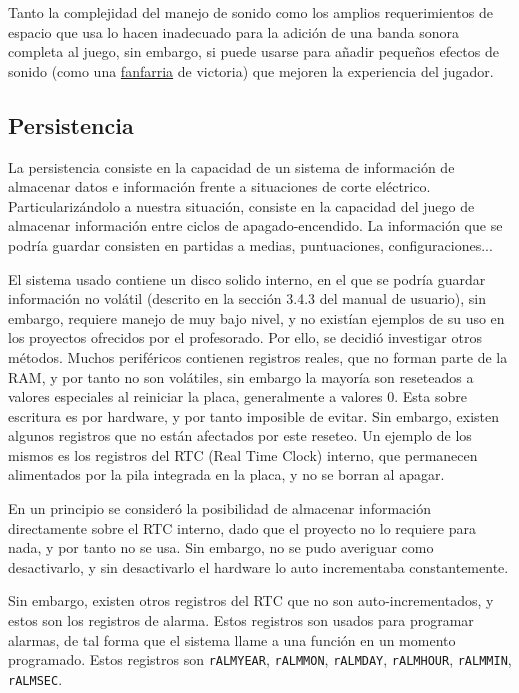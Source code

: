 \documentclass[12pt,letterpaper]{article}
\begin{document}
Tanto la complejidad del manejo de sonido como los amplios
requerimientos de espacio que usa lo hacen inadecuado para la adición
de una banda sonora completa al juego, sin embargo, si puede usarse
para añadir pequeños efectos de sonido (como una
\href{https://www.youtube.com/watch?v=-YCN-a0NsNk}{fanfarria} de
victoria) que mejoren la experiencia del jugador.

\subsection{Persistencia}
\label{subsec:persistencia}
La persistencia consiste en la capacidad de un sistema de información
de almacenar datos e información frente a situaciones de corte
eléctrico. Particularizándolo a nuestra situación, consiste en la
capacidad del juego de almacenar información entre ciclos de
apagado-encendido. La información que se podría guardar consisten en
partidas a medias, puntuaciones, configuraciones...

El sistema usado contiene un disco solido interno, en el que se podría
guardar información no volátil (descrito en la sección 3.4.3 del
manual de usuario), sin embargo, requiere manejo de muy bajo nivel, y
no existían ejemplos de su uso en los proyectos ofrecidos por el
profesorado. Por ello, se decidió investigar otros métodos. Muchos
periféricos contienen registros reales, que no forman parte de la RAM,
y por tanto no son volátiles, sin embargo la mayoría son reseteados a
valores especiales al reiniciar la placa, generalmente a valores
0. Esta sobre escritura es por hardware, y por tanto imposible de
evitar. Sin embargo, existen algunos registros que no están afectados
por este reseteo. Un ejemplo de los mismos es los registros del RTC
(Real Time Clock) interno, que permanecen alimentados por la pila
integrada en la placa, y no se borran al apagar.

En un principio se consideró la posibilidad de almacenar información
directamente sobre el RTC interno, dado que el proyecto no lo requiere
para nada, y por tanto no se usa. Sin embargo, no se pudo averiguar
como desactivarlo, y sin desactivarlo el hardware lo auto incrementaba
constantemente. 

Sin embargo, existen otros registros del RTC que no son
auto-incrementados, y estos son los registros de alarma. Estos
registros son usados para programar alarmas, de tal forma que el
sistema llame a una función en un momento programado. Estos registros
son \texttt{rALMYEAR}, \texttt{rALMMON}, \texttt{rALMDAY},
\texttt{rALMHOUR}, \texttt{rALMMIN}, \texttt{rALMSEC}.
\end{document}
